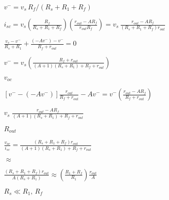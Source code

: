 \documentclass{article}
\def\lthtmlcheckvsize{\ifdim\ht\sizebox<\vsize 
  \ifdim\wd\sizebox<\hsize\expandafter\hfill\fi \expandafter\vfill
  \else\expandafter\vss\fi}%
\begin{document}
{\newpage\clearpage
{}%
$ v^-=v_s \,R_f/(R_s+R_1+R_f)$%
\lthtmlindisplaymathZ
\lthtmlcheckvsize\clearpage}

{\newpage\clearpage
{}%
$\displaystyle i_{sc}=v_s\left(\frac{R_f}{R_s+R_1+R_f}\right)
\left(\frac{r_{out}-AR_f}{r_{out}R_f} \right)
=v_s\,\frac{r_{out}-AR_f}{(R_s+R_1+R_f)r_{out}}$%
\lthtmlindisplaymathZ
\lthtmlcheckvsize\clearpage}

{\newpage\clearpage
{}%
$\displaystyle \frac{v_s-v^-}{R_s+R_1}+\frac{(-Av^-)-v^-}{R_f+r_{out}}=0$%
\lthtmlindisplaymathZ
\lthtmlcheckvsize\clearpage}

{\newpage\clearpage
{}%
$\displaystyle v^-=v_s \left(\frac{R_f+r_{out}}{(A+1)(R_s+R_1)+R_f+r_{out}} \right)$%
\lthtmlindisplaymathZ
\lthtmlcheckvsize\clearpage}

{\newpage\clearpage
{}%
$\displaystyle v_{oc}$%
\lthtmlindisplaymathZ
\lthtmlcheckvsize\clearpage}

{\newpage\clearpage
{}%
$\displaystyle [v^--(-Av^-)]\frac{r_{out}}{R_f+r_{out}}-Av^-
=v^- \left(\frac{r_{out}-AR_f}{R_f+r_{out}}\right)$%
\lthtmlindisplaymathZ
\lthtmlcheckvsize\clearpage}

{\newpage\clearpage
{}%
$\displaystyle v_s \;\frac{r_{out}-AR_f}{(A+1)(R_s+R_1)+R_f+r_{out}}$%
\lthtmlindisplaymathZ
\lthtmlcheckvsize\clearpage}

{\newpage\clearpage
{}%
$\displaystyle R_{out}$%
\lthtmlindisplaymathZ
\lthtmlcheckvsize\clearpage}

{\newpage\clearpage
{}%
$\displaystyle \frac{v_{oc}}{i_{sc}}
=\frac{(R_s+R_1+R_f)r_{out}}{(A+1)(R_s+R_1)+R_f+r_{out}}$%
\lthtmlindisplaymathZ
\lthtmlcheckvsize\clearpage}

{\newpage\clearpage
{}%
$\displaystyle \approx$%
\lthtmlindisplaymathZ
\lthtmlcheckvsize\clearpage}

{\newpage\clearpage
{}%
$\displaystyle \frac{(R_s+R_1+R_f)r_{out}}{A(R_s+R_1)}
\approx \left(\frac{R_1+R_f}{R_1}\right) \frac{r_{out}}{A}$%
\lthtmlindisplaymathZ
\lthtmlcheckvsize\clearpage}

{\newpage\clearpage
{}%
$ R_s\ll R_1,\,R_f$%
\lthtmlindisplaymathZ
\lthtmlcheckvsize\clearpage}
\end{document}

